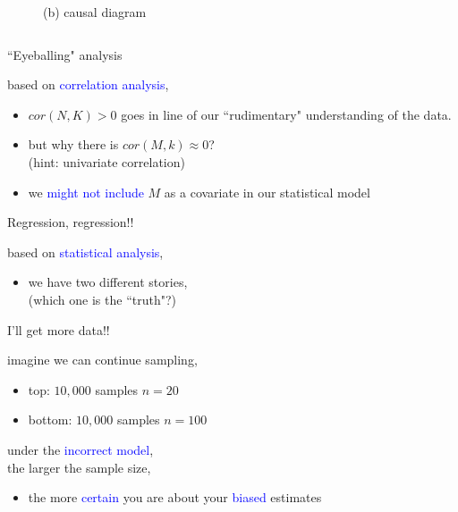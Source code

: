 \begin{frame}
\begin{columns}
\begin{column}{0.5\textwidth}
\begin{figure}
				\caption*{(b) causal diagram}
			\end{figure}
		\end{column}
	\end{columns}
\end{frame}
%
%
\begin{lhframe}[rhgraphic={\texttt{[image: fork2\_panel.pdf]}}]
	{``Eyeballing" analysis}
	
	based on \textcolor{blue}{correlation analysis},
	\begin{itemize}
		\item $cor(N, K)>0$ goes in line of our ``rudimentary" understanding of the data.
		\item but why there is $cor(M, k) \approx 0$? \\
		{\small (hint: univariate correlation)}
		\item we \textcolor{blue}{might not include} $M$ as a covariate in our statistical model
	\end{itemize}
\end{lhframe}
%
%
\begin{lhframe}[rhgraphic={\texttt{[image: fork2\_reg.png]}}]
	{Regression, regression!!}
	
	based on \textcolor{blue}{statistical analysis},
	\begin{itemize}
		\item we have two different stories, \\
		{\small (which one is the ``truth"?)}
	\end{itemize}
\end{lhframe}
%
%
\begin{lhframe}[rhgraphic={\texttt{[image: fork2\_samplesize.pdf]}}]
	{I'll get more data!!}
	
	imagine we can continue sampling,
	\begin{itemize}
		\item top: $10,000$ samples $n=20$
		\item bottom: $10,000$ samples $n=100$
	\end{itemize}
	
	under the \textcolor{blue}{incorrect model}, \\
	the larger the sample size,
	\begin{itemize}
		\item the more \textcolor{blue}{certain} you are about your \textcolor{blue}{biased} estimates
	\end{itemize}
\end{lhframe}
